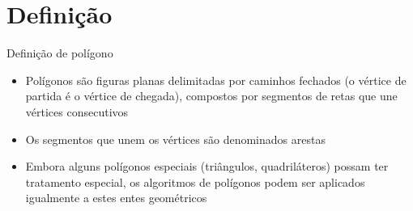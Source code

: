 \section{Definição}

\begin{frame}[fragile]{Definição de polígono}

    \begin{itemize}
        \item Polígonos são figuras planas delimitadas por caminhos fechados 
            (o vértice de partida é o vértice de chegada), compostos por segmentos de retas que 
            une vértices consecutivos

        \item Os segmentos que unem os vértices são denominados arestas

        \item Embora alguns polígonos especiais (triângulos, quadriláteros) possam ter tratamento
            especial, os algoritmos de polígonos podem ser aplicados igualmente a estes entes
            geométricos
    \end{itemize}

    \begin{figure}
        \centering

    \end{figure}

\end{frame}

